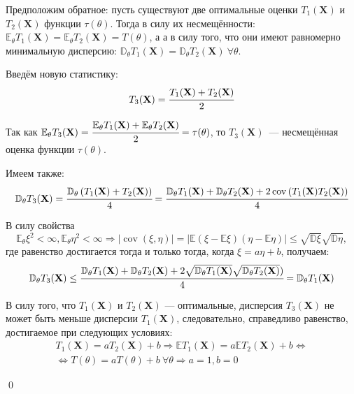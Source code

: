 \documentclass[oneside,final,14pt]{extreport}
\renewenvironment{proof}{{\bfseries Доказательство.}}{\qed}
\theoremstyle{definition}
\begin{document}
\begin{proof}
Предположим обратное: пусть существуют две оптимальные оценки $T_1(\mathbf{X})$ и $T_2(\mathbf{X})$ функции $\tau(\theta)$. Тогда в силу их несмещённости: $\mathbb{E}_{\theta} T_{1}(\mathbf{X})=\mathbb{E}_{\theta} T_{2}(\mathbf{X})=T(\theta)$, а а в силу того, что они имеют равномерно минимальную дисперсию: $\mathbb{D}_{\theta} T_{1}(\mathbf{X})=\mathbb{D}_{\theta} T_{2}(\mathbf{X})~ \forall \theta$.

Введём новую статистику: 
\begin{equation}
    T_{3}(\mathbf{X})=\cfrac{T_{1}(\mathbf{X})+T_{2}(\mathbf{X})}{2}
\end{equation}

Так как $\mathbb{E}_{\theta} T_{3}(\mathbf{X})=\cfrac{\mathbb{E}_{\theta} T_{1}(\mathbf{X})+\mathbb{E}_{\theta} T_{2}(\mathbf{X})}{2}=\tau(\theta)$, то $T_{3}(\mathbf{X})$~--- несмещённая оценка функции $\tau(\theta)$.

Имеем также:
\begin{equation*}
    \mathbb{D}_{\theta} T_{3}(\mathbf{X})=\cfrac{\mathbb{D}_{\theta}\left(T_{1}(\mathbf{X})+T_{2}(\mathbf{X})\right)}{4} =
    \cfrac{\mathbb{D}_{\theta} T_{1}(\mathbf{X})+\mathbb{D}_{\theta} T_{2}(\mathbf{X})+2 \operatorname{cov}\left(T_{1}(\mathbf{X}) T_{2}(\mathbf{X})\right)}{4}
\end{equation*}

В силу свойства
\begin{equation*}
    \mathbb{E}_{\theta} \xi^{2}<\infty, \mathbb{E}_{\theta} \eta^{2}<\infty \Rightarrow|\operatorname{cov}(\xi, \eta)| = | \mathbb{E}(\xi-\mathbb{E} \xi)(\eta-\mathbb{E} \eta)| \leq \sqrt{\mathbb{D} \xi} \sqrt{\mathbb{D} \eta},
\end{equation*}
где равенство достигается тогда и только тогда, когда $\xi=a \eta+b$, получаем:
\begin{equation*}
    \mathbb{D}_{\theta} T_{3}(\mathbf{X}) \leq \cfrac{\mathbb{D}_{\theta} T_{1}(\mathbf{X})+\mathbb{D}_{\theta} T_{2}(\mathbf{X})+2 \sqrt{\mathbb{D}_{\theta} T_{1}(\mathbf{X})} \sqrt{\mathbb{D}_{\theta} T_{2}(\mathbf{X})})}{4} =\mathbb{D}_{\theta} T_{1}(\mathbf{X})
\end{equation*}

В силу того, что $T_1(\mathbf{X})$ и $T_2(\mathbf{X})$ — оптимальные, дисперсия $T_3(\mathbf{X})$ не может быть меньше дисперсии $T_1(\mathbf{X})$, следовательно, справедливо равенство, достигаемое при следующих условиях:
\begin{equation*}
\begin{aligned}
    T_{1}(\mathbf{X})=a T_{2}(\mathbf{X})+b \Rightarrow \mathbb{E} T_{1}(\mathbf{X})
    = a \mathbb{E} T_{2}(\mathbf{X})+b 
    \Leftrightarrow \\
    \Leftrightarrow T(\theta) = a T(\theta)+b~ \forall \theta \Rightarrow a = 1, b = 0
\end{aligned}
\end{equation*}

\end{proof}
\end{document}
